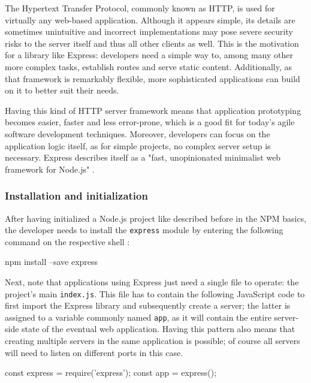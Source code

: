 \documentclass{bioinfo}
\begin{document}
The Hypertext Transfer Protocol, commonly known as HTTP, is used for virtually any web-based application. Although it appears simple, its details are sometimes unintuitive and incorrect implementations may pose severe security risks to the server itself and thus all other clients as well. This is the motivation for a library like Express: developers need a simple way to, among many other more complex tasks, establish routes and serve static content. Additionally, as that framework is remarkably flexible, more sophisticated applications can build on it to better suit their needs.

Having this kind of HTTP server framework means that application prototyping becomes easier, faster and less error-prone, which is a good fit for today's agile software development techniques. Moreover, developers can focus on the application logic itself, as for simple projects, no complex server setup is necessary. Express describes itself as a "fast, unopinionated minimalist web framework for Node.js" \cite{expresshome}.

\subsubsection{Installation and initialization}

After having initialized a Node.js project like described before in the NPM basics, the developer needs to install the \texttt{express} module by entering the following command on the respective shell \cite{expressinstalling}:

\begin{verbatim*}
    npm install --save express
\end{verbatim*}

Next, note that applications using Express just need a single file to operate: the project's main \texttt{index.js}. This file has to contain the following JavaScript code to first import the Express library and subsequently create a server; the latter is assigned to a variable commonly named \texttt{app}, as it will contain the entire server-side state of the eventual web application. Having this pattern also means that creating multiple servers in the same application is possible; of course all servers will need to listen on different ports in this case.

\begin{verbatim*}
    const express = require('express');
    const app = express();
\end{verbatim*}
\end{document}
